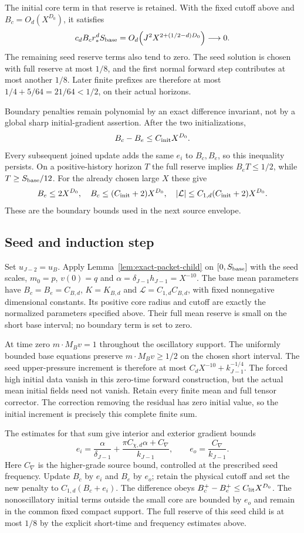 \documentclass[11pt]{article}
\theoremstyle{definition}
\begin{document}
The initial core term in that reserve is retained. With the fixed
cutoff above and $B_c=O_d(X^{D_0})$, it satisfies
\[
 c_dB_cr_*^dS_{\rm base}
     =O_d\!\left(J^2X^{2+(1/2-d)D_0}\right)\longrightarrow0.
\]
The remaining seed reserve terms also tend to zero. The
seed solution is chosen with full reserve at most $1/8$, and the first
normal forward step contributes at most another $1/8$. Later finite prefixes
are therefore at most $1/4+5/64=21/64<1/2$, on their actual horizons.

Boundary penalties remain polynomial by an exact difference invariant,
not by a global sharp initial-gradient assertion. After the two
initializations,
\[
 B_c-B_e\leq C_{\rm init}X^{D_0}.
\]
Every subsequent joined update adds the same $e_i$ to $B_c,B_e$, so
this inequality persists. On a positive-history horizon $T$ the full
reserve implies $B_eT\leq1/2$, while $T\geq S_{\rm base}/12$.
For the already chosen large $X$ these give
\[
 B_e\leq2X^{D_0},\quad
 B_c\leq(C_{\rm init}+2)X^{D_0},\quad
 |\mathcal L|\leq C_{1,d}(C_{\rm init}+2)X^{D_0}.
\]
These are the boundary bounds used in the next source envelope.

\subsection{Seed and induction step}
Set $u_{J-2}=u_B$. Apply Lemma~\ref{lem:exact-packet-child} on
$[0,S_{\rm base}]$ with the seed scales, $m_0=p$, $v(0)=q$ and
$\alpha=\delta_{J-1}h_{J-1}=X^{-10}$. The base mean parameters have
$B_c=B_e=C_{B,d}$, $K=K_{B,d}$ and
$\mathcal L=C_{1,d}C_{B,d}$, with fixed nonnegative dimensional
constants. Its positive core radius and cutoff are exactly the
normalized parameters specified above. Their full mean reserve is small on
the short base interval; no boundary term is set to zero.

At time zero $m\cdot M_Bv=1$ throughout the oscillatory support.
The uniformly bounded base equations preserve
$m\cdot M_Bv\geq1/2$ on the chosen short interval. The seed
upper-pressure increment is therefore at most
$C_dX^{-10}+k_{J-1}^{-1/4}$. The forced high initial data vanish in
this zero-time forward construction, but the actual mean initial
fields need not vanish. Retain every finite mean and full tensor
corrector. The correction removing the residual has zero initial value,
so the initial increment is precisely this complete finite sum.

The estimates for that sum give interior and exterior gradient bounds
\[
 e_i=\frac{\alpha}{\delta_{J-1}}
          +\frac{\pi C_{\chi,d}\alpha+C_\nabla}{k_{J-1}},
 \qquad e_o=\frac{C_\nabla}{k_{J-1}}.
\]
Here $C_\nabla$ is the higher-grade source bound, controlled at the
prescribed seed frequency. Update $B_c$ by $e_i$ and $B_e$ by $e_o$;
retain the physical cutoff and set the new penalty to $C_{1,d}(B_c+e_i)$.
The difference obeys $B_c^+-B_e^+\leq C_{\rm lit}X^{D_0}$.
The nonoscillatory initial terms outside the small core are bounded by
$e_o$ and remain in the common fixed compact support. The full reserve
of this seed child is at most $1/8$ by the explicit short-time
and frequency estimates above.
\end{document}
